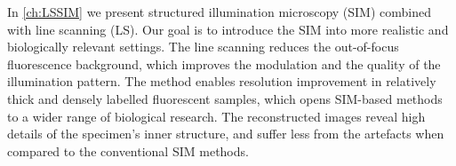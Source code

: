 In \autoref{ch:LSSIM} we present structured illumination microscopy (SIM) combined with line scanning (LS). Our goal is to introduce the SIM into more realistic and biologically relevant settings. The line scanning reduces the out-of-focus fluorescence background, which improves the modulation and the quality of the illumination pattern. The method enables resolution improvement in relatively thick and densely labelled fluorescent samples, which opens SIM-based methods to a wider range of biological research. The reconstructed images reveal high details of the specimen's inner structure, and suffer less from the artefacts when compared to the conventional SIM methods.  


